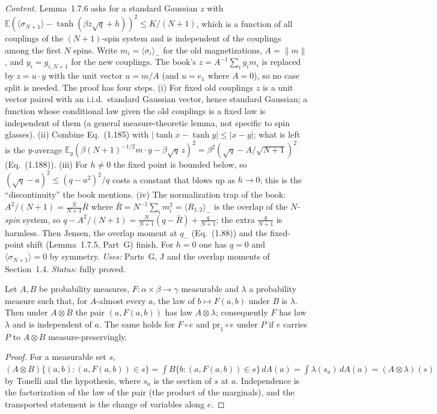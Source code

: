 \emph{Content.}  Lemma~1.7.6 asks for a standard Gaussian $z$ with $\mathbb E(\langle\sigma_{N+1}\rangle-\tanh(\beta z\sqrt q+h))^2\le K/(N+1)$, which is a function of all couplings of the $(N+1)$-spin system and is independent of the couplings among the first $N$ spins.
Write $m_i=\langle\sigma_i\rangle_-$ for the old magnetizations, $A=\|m\|$, and $y_i=g_{i,N+1}$ for the new couplings.  The book's $z=A^{-1}\sum_iy_im_i$ is replaced by $z=u\cdot y$ with the unit vector $u=m/A$ (and $u=e_1$ where $A=0$), so no case split is needed.  The proof has four steps.
(i) For fixed old couplings $z$ is a unit vector paired with an i.i.d.\ standard Gaussian vector, hence standard Gaussian; a function whose conditional law given the old couplings is a fixed law is independent of them (a general measure-theoretic lemma, not specific to spin glasses).
(ii) Combine Eq.~(1.185) with $|\tanh x-\tanh y|\le|x-y|$; what is left is the $y$-average $\mathbb E_y(\beta(N+1)^{-1/2}m\cdot y-\beta\sqrt q\,z)^2=\beta^2(\sqrt q-A/\sqrt{N+1})^2$ (Eq.~(1.188)).
(iii) For $h\ne0$ the fixed point is bounded below, so $(\sqrt q-a)^2\le(q-a^2)^2/q$ costs a constant that blows up as $h\to0$; this is the ``discontinuity'' the book mentions.
(iv) The normalization trap of the book: $A^2/(N+1)=\frac N{N+1}\bar R$ where $\bar R=N^{-1}\sum_im_i^2=\langle R_{1,2}\rangle_-$ is the overlap of the \emph{$N$-spin} system, so $q-A^2/(N+1)=\frac N{N+1}(q-\bar R)+\frac q{N+1}$; the extra $\frac q{N+1}$ is harmless.  Then Jensen, the overlap moment at $q_-$ (Eq.~(1.88)) and the fixed-point shift (Lemma~1.7.5, Part~G) finish.
For $h=0$ one has $q=0$ and $\langle\sigma_{N+1}\rangle=0$ by symmetry.
\emph{Uses:} Parts~G, J and the overlap moments of Section~1.4.  \emph{Status:} fully proved.

\begin{lemma}
\label{lem:sg-tal:fibre-independence}
  \leanok
{}
Let $A,B$ be probability measures, $F:\alpha\times\beta\to\gamma$ measurable and $\lambda$ a probability measure such that, for $A$-almost every $a$, the law of $b\mapsto F(a,b)$ under $B$ is $\lambda$.  Then under $A\otimes B$ the pair $(a,F(a,b))$ has law $A\otimes\lambda$; consequently $F$ has law $\lambda$ and is independent of $a$.  The same holds for $F\circ e$ and $\mathrm{pr}_1\circ e$ under $P$ if $e$ carries $P$ to $A\otimes B$ measure-preservingly.
\end{lemma}
\begin{proof}
  \leanok
For a measurable set $s$, $(A\otimes B)\{(a,b):(a,F(a,b))\in s\}=\int B\{b:(a,F(a,b))\in s\}\,dA(a)=\int\lambda(s_a)\,dA(a)=(A\otimes\lambda)(s)$ by Tonelli and the hypothesis, where $s_a$ is the section of $s$ at $a$.  Independence is the factorization of the law of the pair (the product of the marginals), and the transported statement is the change of variables along $e$.
\end{proof}

